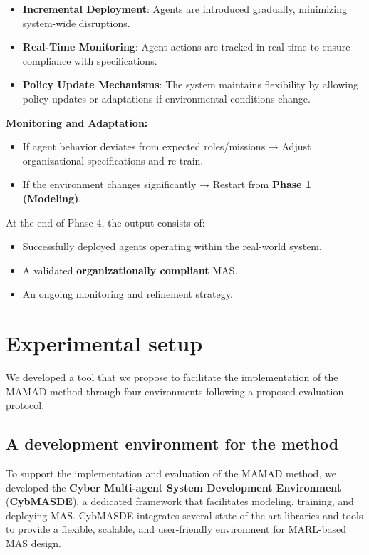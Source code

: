 \documentclass[pdflatex,sn-mathphys-num]{sn-jnl}%
\theoremstyle{thmstyleone}%
\theoremstyle{thmstyletwo}%
\theoremstyle{thmstylethree}%
\begin{document}
\begin{itemize}
    \item \textbf{Incremental Deployment}: Agents are introduced gradually, minimizing system-wide disruptions.
    \item \textbf{Real-Time Monitoring}: Agent actions are tracked in real time to ensure compliance with specifications.
    \item \textbf{Policy Update Mechanisms}: The system maintains flexibility by allowing policy updates or adaptations if environmental conditions change.
\end{itemize}

\noindent \textbf{Monitoring and Adaptation:}
\begin{itemize}
    \item If agent behavior deviates from expected roles/missions → Adjust organizational specifications and re-train.
    \item If the environment changes significantly → Restart from \textbf{Phase 1 (Modeling)}.
\end{itemize}

At the end of Phase 4, the output consists of:
\begin{itemize}
    \item Successfully deployed agents operating within the real-world system.
    \item A validated \textbf{organizationally compliant} MAS.
    \item An ongoing monitoring and refinement strategy.
\end{itemize}


\clearpage


\section{Experimental setup}
\label{sec:experimental_setup}

We developed a tool that we propose to facilitate the implementation of the MAMAD method through four environments following a proposed evaluation protocol.

\subsection{A development environment for the method}

To support the implementation and evaluation of the MAMAD method, we developed the \textbf{Cyber Multi-agent System Development Environment} (\textbf{CybMASDE}), a dedicated framework that facilitates modeling, training, and deploying MAS. CybMASDE integrates several state-of-the-art libraries and tools to provide a flexible, scalable, and user-friendly environment for MARL-based MAS design.
\end{document}
